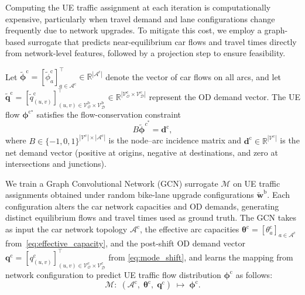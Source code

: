 \documentclass[lettersize,journal]{IEEEtran}
\begin{document}
Computing the UE traffic assignment at each iteration is computationally expensive, particularly when travel demand and lane configurations change frequently due to network upgrades. To mitigate this cost, we employ a graph-based surrogate that predicts near-equilibrium car flows and travel times directly from network-level features, followed by a projection step to ensure feasibility.

Let $\tilde{\boldsymbol{\phi}}^\mathrm{c} = [\tilde{\phi}_a^\mathrm{c}]_{a \in \mathcal{A}^\mathrm{c}}^\top \in \mathbb{R}^{|\mathcal{A}^\mathrm{c}|}$ denote the vector of car flows on all arcs, and let $\tilde{\boldsymbol{q}}^\mathrm{c} = [\tilde{q}_{(u,v)}^\mathrm{c}]_{(u, v) \in \mathcal{V}_{\mathcal{O}}^\mathrm{b}\times \mathcal{V}_{\mathcal{D}}^\mathrm{b}}^\top \in \mathbb{R}^{|\mathcal{V}^\mathrm{c}_{\mathcal{O}} \times \mathcal{V}^\mathrm{c}_{\mathcal{D}}|}$ represent the OD demand vector. The UE flow $\boldsymbol{\phi}^{\mathrm{c}^\star}$ satisfies the flow-conservation constraint
\begin{equation}
    B \tilde{\boldsymbol{\phi}}^{c^{\ast}} = \boldsymbol{d}^\mathrm{c},
\end{equation}
where $B \in \{-1,0,1\}^{|\mathcal{V}^\mathrm{c}| \times |\mathcal{A}^\mathrm{c}|}$ is the node--arc incidence matrix and $\boldsymbol{d}^\mathrm{c} \in \mathbb{R}^{|\mathcal{V}^\mathrm{c}|}$ is the net demand vector (positive at origins, negative at destinations, and zero at intersections and junctions).

We train a Graph Convolutional Network (GCN) surrogate $\mathcal{M}$ on UE traffic assignments obtained under random bike-lane upgrade configurations $\tilde{\boldsymbol{w}}^\mathrm{b}$. 
Each configuration alters the car network capacities and OD demands, generating distinct equilibrium flows and travel times used as ground truth. 
The GCN takes as input the car network topology $\mathcal{A}^\mathrm{c}$, the effective arc capacities $\boldsymbol{\theta}^\mathrm{c} = [\theta_{a}^\mathrm{c}]_{a \in \mathcal{A}^\mathrm{c}}$ from~\eqref{eq:effective_capacity}, and the post-shift OD demand vector 
$\boldsymbol{q}^\mathrm{c} = [q_{(u,v)}^\mathrm{c}]_{(u,v) \in \mathcal{V}_{\mathcal{O}}^\mathrm{c} \times \mathcal{V}_{\mathcal{D}}^\mathrm{c}}^{\top}$ from \eqref{eq:mode_shift}, 
and learns the mapping from network configuration to predict UE traffic flow distribution $\boldsymbol{\phi}^\mathrm{c}$ as follows:
\begin{equation}
    \mathcal{M}:\; (\mathcal{A}^\mathrm{c},\; \boldsymbol{\theta}^\mathrm{c},\; \boldsymbol{q}^\mathrm{c})
    \;\longmapsto\;
    \boldsymbol{\phi}^\mathrm{c}.
\end{equation}
\end{document}
